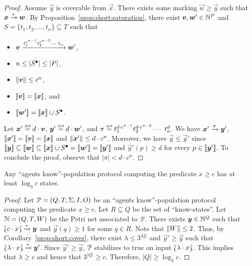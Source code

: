 \begin{proof}
  Assume $\vec{y}$ is coverable from $\vec{x}$. There exists some
  marking $\vec{w} \geq \vec{y}$ such that $\bm{x} \xrightarrow{*}
  \bm{w}$. By Proposition~\ref{prop:short:saturation}, there exist
  $\bm{v}, \bm{w}' \in \mathbb{N}^P$ and $S = \{t_1, t_2, \ldots, t_n\}
  \subseteq T$ such that
  \begin{itemize}
  \item $\bm{v} \xrightarrow{t_1^{c^{n-1}} t_2^{c^{n-2}} \cdots\ t_n}
    \bm{w}'$,

  \item $n \leq |{S^\bullet}| \leq |P|$,

  \item $\lVert\bm{v}\rVert \leq c^n$,

  \item $\llbracket\bm{v}\rrbracket = \llbracket\bm{x}\rrbracket$, and 

  \item $\llbracket\bm{w}'\rrbracket = \llbracket\bm{x}\rrbracket \cup {S^\bullet}$.
  \end{itemize}

  Let $\bm{x}' \stackrel{\scriptscriptstyle\text{def}}{=} d \cdot \bm{v}$, $\bm{y}' \stackrel{\scriptscriptstyle\text{def}}{=} d \cdot
  \bm{w}'$, and $\pi \stackrel{\scriptscriptstyle\text{def}}{=} t_1^{d \cdot c^{n-1}} t_2^{d \cdot
    c^{n-2}} \cdots\ t_n^{d}$. We have $\bm{x}' \xrightarrow{\pi}
  \bm{y}'$, $\llbracket\bm{x}'\rrbracket = \llbracket\bm{v}\rrbracket = \llbracket\bm{x}\rrbracket$ and
  $\lVert\bm{x}'\rVert \leq d \cdot c^n$. Moreover, we have $\vec{y} \leq
  \vec{y}'$ since $\llbracket\bm{y}\rrbracket \subseteq \llbracket\bm{w}\rrbracket \subseteq
  \llbracket\bm{x}\rrbracket \cup {S^\bullet} = \llbracket\bm{w}'\rrbracket = \llbracket\bm{y}'\rrbracket$
  and $\vec{y}'(p) \geq d$ for every $p \in \llbracket\bm{y}'\rrbracket$. To
  conclude the proof, observe that $|\pi| < d \cdot c^n$.
\end{proof}

\begin{theorem}
  Any ``agents know''-population protocol computing the predicate $x
  \geq c$ has at least $\log_3 c$ states.
\end{theorem}

\begin{proof}
  Let $\mathcal{P} = (Q, T, \Sigma, I, O)$ be an ``agents know''-population
  protocol computing the predicate $x \geq c$. Let $R \subseteq Q$ be
  the set of ``know-states''. Let $\mathcal{N} = (Q, T, W)$ be the Petri net
  associated to $\mathcal{P}$. There exists $\bm{y} \in \mathbb{N}^Q$ such that
  $\Lbag c \cdot x\Rbag \xrightarrow{*} \bm{y}$ and $\vec{y}(q) \geq 1$ for
  some $q \in R$. Note that $\lVert W\rVert \leq 2$. Thus, by
  Corollary~\ref{prop:short:cover}, there exist $\lambda \leq 3^{|Q|}$
  and $\vec{y}' \geq \vec{y}$ such that $\Lbag\lambda \cdot x\Rbag
  \xrightarrow{*} \bm{y}'$. Since $\vec{y}' \geq \vec{y}$, $\mathcal{P}$ stabilizes
  to true on input $\Lbag\lambda \cdot x\Rbag$. This implies that
  $\lambda \geq c$ and hence that $3^{|Q|} \geq c$. Therefore, $|Q|
  \geq \log_3 c$.
\end{proof}
